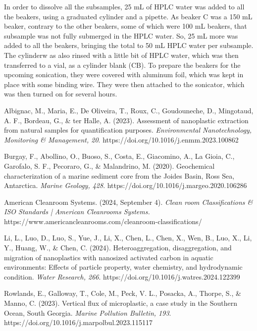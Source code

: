 \documentclass[twocolumn,a4paper,aps,amsmath,amssymb,floatfix,superscriptaddress]{revtex4-2}
\begin{document}
	In order to dissolve all the subsamples, 25 mL of HPLC water was added to all the beakers, using a graduated cylinder and a pipette. As beaker C was a 150 mL beaker, contrary to the other beakers, some of which were 100 mL beakers, that subsample was not fully submerged in the HPLC water. So, 25 mL more was added to all the beakers, bringing the total to 50 mL HPLC water per subsample. \\ The cylinderw as also rinsed with a little bit of HPLC water, which was then transferred to a vial, as a cylinder blank (CB).
	To prepare the beakers for the upcoming sonication, they were covered with aluminum foil, which was kept in place with some binding wire. They were then attached to the sonicator, which was then turned on for several hours.
	
	\begin{thebibliography}{99}		
		Albignac, M., Maria, E., De Oliveira, T., Roux, C., Goudouneche, D., Mingotaud, A. F., Bordeau, G., \& ter Halle, A. (2023). Assessment of nanoplastic extraction from natural samples for quantification purposes. \textit{Environmental Nanotechnology, Monitoring \& Management, 20}. https://doi.org/10.1016/j.enmm.2023.100862
		
		Burgay, F., Abollino, O., Buoso, S., Costa, E., Giacomino, A., La Gioia, C., Garofalo, S. F., Pecoraro, G., \& Malandrino, M. (2020). Geochemical characterization of a marine sediment core from the Joides Basin, Ross Sea, Antarctica. \textit{Marine Geology, 428}. https://doi.org/10.1016/j.margeo.2020.106286 
				
		American Cleanroom Systems. (2024, September 4). \textit{Clean room Classifications \& ISO Standards | American Cleanrooms Systems.} https://www.americancleanrooms.com/cleanroom-classifications/
		
		Li, L., Luo, D., Luo, S., Yue, J., Li, X., Chen, L., Chen, X., Wen, B., Luo, X., Li, Y., Huang, W., \& Chen, C. (2024). Heteroaggregation, disaggregation, and migration of nanoplastics with nanosized activated carbon in aquatic environments: Effects of particle property, water chemistry, and hydrodynamic condition. \textit{Water Research, 266}. https://doi.org/10.1016/j.watres.2024.122399
		
		Rowlands, E., Galloway, T., Cole, M., Peck, V. L., Posacka, A., Thorpe, S., \& Manno, C. (2023). Vertical flux of microplastic, a case study in the Southern Ocean, South Georgia. \textit{Marine Pollution Bulletin, 193}. https://doi.org/10.1016/j.marpolbul.2023.115117
		

\end{thebibliography}
\end{document}
